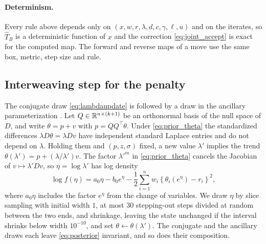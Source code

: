 \paragraph{Determinism.} Every rule above depends only on $(x, w, r, \lambda, d, c, \gamma, \ell, u)$ and on the iterates, so $\widehat T_B$ is a deterministic function of $x$ and the correction \eqref{eq:joint_accept} is exact for the computed map. The forward and reverse maps of a move use the same box, metric, step size and rule.

\subsection{Interweaving step for the penalty}
\label{app:pmala:asis}

The conjugate draw \eqref{eq:lambdaupdate} is followed by a draw in the ancillary parameterization \citep{yu2011center}. Let $Q \in \mathbb{R}^{n\times(k+1)}$ be an orthonormal basis of the null space of $D$, and write $\theta = p + v$ with $p = QQ^\top\theta$. Under \eqref{eq:prior_theta} the standardized differences $\lambda D\theta = \lambda Dv$ have independent standard Laplace entries and do not depend on $\lambda$. Holding them and $(p, z, \sigma)$ fixed, a new value $\lambda'$ implies the trend $\theta(\lambda') = p + (\lambda/\lambda')v$. The factor $\lambda'^m$ in \eqref{eq:prior_theta} cancels the Jacobian of $v \mapsto \lambda' Dv$, so $\eta = \log\lambda'$ has log density
\begin{equation}
\log f(\eta) = a_0\eta - b_0 e^\eta - \frac12\sum_{i=1}^n w_i\left\{\theta_i(e^\eta) - r_i\right\}^2 ,
\label{eq:asis_density}
\end{equation}
where $a_0\eta$ includes the factor $e^\eta$ from the change of variables. We draw $\eta$ by slice sampling \citep{neal2003slice} with initial width $1$, at most $30$ stepping-out steps divided at random between the two ends, and shrinkage, leaving the state unchanged if the interval shrinks below width $10^{-10}$, and set $\theta \leftarrow \theta(\lambda')$. The conjugate and the ancillary draws each leave \eqref{eq:posterior} invariant, and so does their composition.


